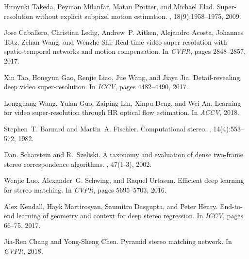 \documentclass[10pt,twocolumn,letterpaper]{article}
\begin{document}
\begin{thebibliography}{10}
	Hiroyuki Takeda, Peyman Milanfar, Matan Protter, and Michael Elad.
	\newblock Super-resolution without explicit subpixel motion estimation.
	, 18(9):1958--1975, 2009.
	
	Jose Caballero, Christian Ledig, Andrew~P. Aitken, Alejandro Acosta, Johannes
	Totz, Zehan Wang, and Wenzhe Shi.
	\newblock Real-time video super-resolution with spatio-temporal networks and
	motion compensation.
	\newblock In {\em CVPR}, pages 2848--2857, 2017.
	
	Xin Tao, Hongyun Gao, Renjie Liao, Jue Wang, and Jiaya Jia.
	\newblock Detail-revealing deep video super-resolution.
	\newblock In {\em ICCV}, pages 4482--4490, 2017.
	
	Longguang Wang, Yulan Guo, Zaiping Lin, Xinpu Deng, and Wei An.
	\newblock Learning for video super-resolution through {HR} optical flow
	estimation.
	\newblock In {\em ACCV}, 2018.
	
	Stephen~T. Barnard and Martin~A. Fischler.
	\newblock Computational stereo.
	, 14(4):553--572, 1982.
	
	Dan. Scharstein and R.~Szeliski.
	\newblock A taxonomy and evaluation of dense two-frame stereo correspondence
	algorithms.
	, 47(1-3), 2002.
	
	Wenjie Luo, Alexander~G. Schwing, and Raquel Urtasun.
	\newblock Efficient deep learning for stereo matching.
	\newblock In {\em CVPR}, pages 5695--5703, 2016.
	
	Alex Kendall, Hayk Martirosyan, Saumitro Dasgupta, and Peter Henry.
	\newblock End-to-end learning of geometry and context for deep stereo
	regression.
	\newblock In {\em ICCV}, pages 66--75, 2017.
	
	Jia{-}Ren Chang and Yong{-}Sheng Chen.
	\newblock Pyramid stereo matching network.
	\newblock In {\em CVPR}, 2018.
	

\end{thebibliography}
\end{document}
